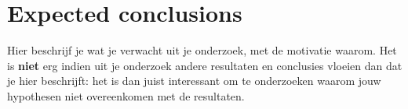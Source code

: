 \documentclass[fleqn,10pt]{voorstel}
\begin{document}
\section{Expected conclusions}
\label{sec:expected_conclusions}

Hier beschrijf je wat je verwacht uit je onderzoek, met de motivatie waarom. Het is \textbf{niet} erg indien uit je onderzoek andere resultaten en conclusies vloeien dan dat je hier beschrijft: het is dan juist interessant om te onderzoeken waarom jouw hypothesen niet overeenkomen met de resultaten.


\printbibliography[heading=bibintoc]
\end{document}
